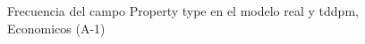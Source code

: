\begin{figure}[H]
    \centering
    
    \caption{Frecuencia del campo Property type en el modelo real y tddpm, Economicos (A-1)}
    \label{frecuency-Property Type-tddpm_mlp}
\end{figure}